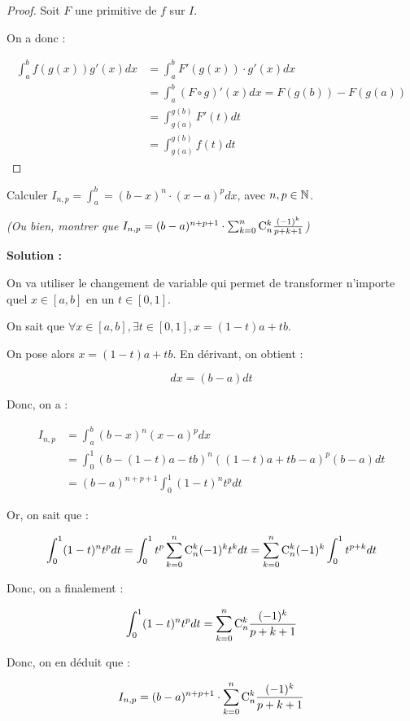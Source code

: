 \documentclass[12pt, a4paper]{report}
\begin{document}
\begin{proof}
    Soit $F$ une primitive de $f$ sur $I$.

    On a donc :

    \begin{align*}
        \int_a^b f(g(x))g'(x)dx&=\int_a^b F'(g(x))\cdot g'(x)dx\\
        &=\int_a^b (F\circ g)'(x)dx=F(g(b))-F(g(a))\\
        &=\int_{g(a)}^{g(b)}F'(t)dt\\
        &=\int_{g(a)}^{g(b)}f(t)dt
    \end{align*}
\end{proof}

\begin{example}
    Calculer $I_{n,p}=\int_a^b=(b-x)^n\cdot (x-a)^p dx$, avec $n,p\in\mathbb{N}$.

    \textit{(Ou bien, montrer que $I_{n,p}=(b-a)^{n+p+1}\cdot \sum_{k=0}^n\mathrm{C}_{n}^{k}\frac{(-1)^k}{p+k+1}$)}

    \textbf{Solution :}

    On va utiliser le changement de variable qui permet de transformer n'importe quel $x\in[a,b]$ en un $t\in[0,1]$.

    On sait que $\forall x \in [a,b], \exists t \in [0,1], x=(1-t)a + tb$.

    On pose alors $x=(1-t)a+tb$. En dérivant, on obtient :

    $$dx = (b-a)dt$$

    Donc, on a :

    \begin{align*}
        I_{n,p} &= \int_a^b (b-x)^n (x-a)^p dx \\
        &= \int_0^1 (b-(1-t)a-tb)^n ((1-t)a+tb-a)^p (b-a)dt \\
        &= (b-a)^{n+p+1} \int_0^1 (1-t)^n t^p dt
    \end{align*}

    Or, on sait que :

    $$\int_0^1 (1-t)^n t^p dt = \int_0^1 t^p \sum_{k=0}^n \mathrm{C}_{n}^{k} (-1)^k t^k dt = \sum_{k=0}^n \mathrm{C}_{n}^{k} (-1)^k \int_0^1 t^{p+k} dt$$

    Donc, on a finalement :

    $$\int_0^1 (1-t)^n t^p dt = \sum_{k=0}^n \mathrm{C}_{n}^{k} \frac{(-1)^k}{p+k+1}$$

    Donc, on en déduit que :

    $$I_{n,p} = (b-a)^{n+p+1} \cdot \sum_{k=0}^n \mathrm{C}_{n}^{k} \frac{(-1)^k}{p+k+1}$$
\end{example}
\end{document}

